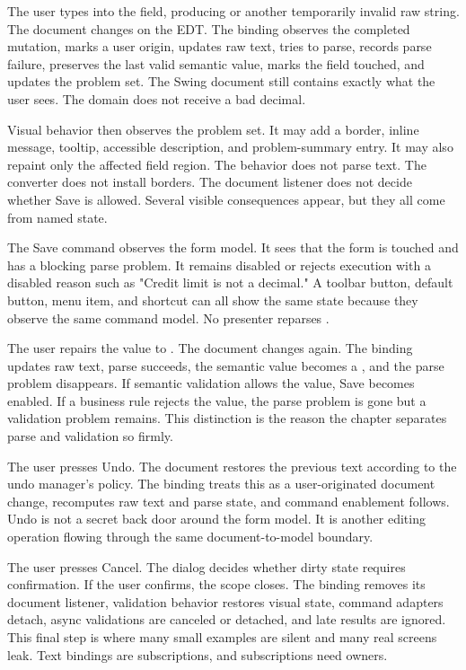 The user types  into the field, producing  or another
temporarily invalid raw string. The document changes on the EDT. The binding
observes the completed mutation, marks a user origin, updates raw text, tries
to parse, records parse failure, preserves the last valid semantic value, marks
the field touched, and updates the problem set. The Swing document still
contains exactly what the user sees. The domain does not receive a bad decimal.

Visual behavior then observes the problem set. It may add a border, inline
message, tooltip, accessible description, and problem-summary entry. It may
also repaint only the affected field region. The behavior does not parse text.
The converter does not install borders. The document listener does not decide
whether Save is allowed. Several visible consequences appear, but they all
come from named state.

The Save command observes the form model. It sees that the form is touched and
has a blocking parse problem. It remains disabled or rejects execution with a
disabled reason such as "Credit limit is not a decimal." A toolbar button,
default button, menu item, and shortcut can all show the same state because
they observe the same command model. No presenter reparses .

The user repairs the value to . The document changes again. The
binding updates raw text, parse succeeds, the semantic value becomes a
, and the parse problem disappears. If semantic validation
allows the value, Save becomes enabled. If a business rule rejects the value,
the parse problem is gone but a validation problem remains. This distinction is
the reason the chapter separates parse and validation so firmly.

The user presses Undo. The document restores the previous text according to the
undo manager's policy. The binding treats this as a user-originated document
change, recomputes raw text and parse state, and command enablement follows.
Undo is not a secret back door around the form model. It is another editing
operation flowing through the same document-to-model boundary.

The user presses Cancel. The dialog decides whether dirty state requires
confirmation. If the user confirms, the scope closes. The binding removes its
document listener, validation behavior restores visual state, command adapters
detach, async validations are canceled or detached, and late results are
ignored. This final step is where many small examples are silent and many real
screens leak. Text bindings are subscriptions, and subscriptions need owners.

